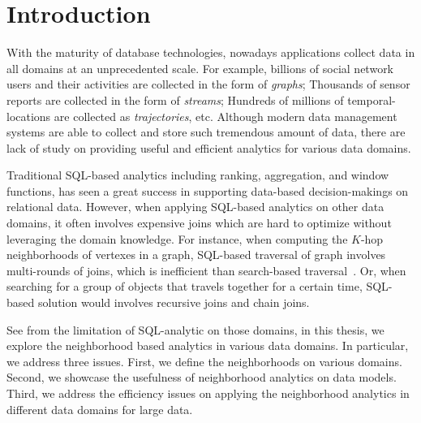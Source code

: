 \chapter{Introduction}
With the maturity of database technologies, nowadays
applications collect data in all domains at an
unprecedented scale. For example, billions of 
social network users and their activities are collected in the form
of \emph{graphs}; Thousands of sensor reports are collected
in the form of \emph{streams}; Hundreds of millions of temporal-locations
are collected as \emph{trajectories}, etc.
Although modern data management systems are able to collect
and store such tremendous amount of data, there are lack
of study on providing useful and efficient analytics for various data domains.

Traditional SQL-based analytics including ranking, aggregation, 
and window functions, has seen a great success in supporting
data-based decision-makings on relational data. However, 
when applying SQL-based analytics on other data domains, it often
involves expensive joins which are hard to optimize without leveraging the domain
knowledge. For instance, when computing the $K$-hop neighborhoods of vertexes in a graph, 
SQL-based traversal of graph involves multi-rounds of joins, which is inefficient
than search-based traversal~\cite{}. Or, when searching for a group of objects
that travels together for a certain time, SQL-based solution would involves
recursive joins and chain joins.

See from the limitation of SQL-analytic on those domains, in this thesis, we 
explore the neighborhood based analytics in various data domains.
In particular, we address three issues. First, we define the neighborhoods
on various domains. Second, we showcase the usefulness of neighborhood analytics 
on data models.
Third, we address the efficiency issues on applying the neighborhood
analytics in different data domains for large data.

% 
%


